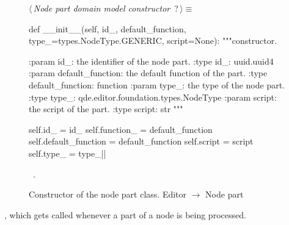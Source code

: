 \documentclass[%
    a4paper,    %
    justified,  %
    nobib,      %
    openany     %
]{tufte-book}
\makeatletter
\renewcommand{\label}[1]{\@tufte@label{##1}}%
\makeatother
\begin{document}
\begin{figure}
\begin{flushleft} \small
\begin{minipage}{\linewidth}\label{scrap116}\raggedright\small
{} $\langle\,${\itshape Node part domain model constructor}\nobreak\ {\footnotesize {?}}$\,\rangle\equiv$
\vspace{-1ex}
\begin{pythoncode}
def __init__(self, id_, default_function, type_=types.NodeType.GENERIC, script=None):
    """constructor.

    :param id_: the identifier of the node part.
    :type  id_: uuid.uuid4
    :param default_function: the default function of the part.
    :type default_function: function
    :param type_: the type of the node part.
    :type type_: qde.editor.foundation.types.NodeType
    :param script: the script of the part.
    :type script: str
    """

    self.id_              = id_
    self.function_        = default_function
    self.default_function = default_function
    self.script           = script
    self.type_            = type_|\NWsep|
\end{pythoncode}
\vspace{1.5ex}
\footnotesize
\begin{list}{}{\setlength{\itemsep}{-\parsep}\setlength{\itemindent}{-\leftmargin}}
\item \NWtxtMacroRefIn\ .

\item{}
\end{list}
\end{minipage}\vspace{4ex}
\end{flushleft}
\caption{Constructor of the node part class.
  \newline{}\newline{}Editor $\rightarrow$ Node part}
\label{editor:lst:node-part:constructor}
\end{figure}

, which gets called whenever a part
of a node is being processed.
\end{document}
